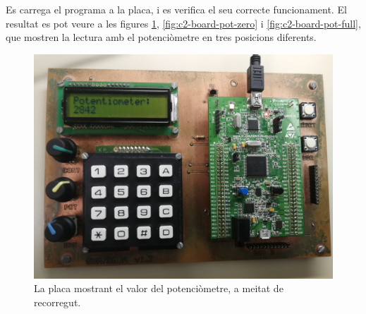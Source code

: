 Es carrega el programa a la placa, i es verifica el seu correcte funcionament.
El resultat es pot veure a les figures \ref{fig:c2-board-pot-mid}, \ref{fig:c2-board-pot-zero}
i \ref{fig:c2-board-pot-full}, que mostren la lectura amb el potenciòmetre en tres posicions diferents.

\begin{figure}
  \includegraphics[width=.99\columnwidth]{../photos/board/c2-pot-mid}
  \caption{ \label{fig:c2-board-pot-mid} La placa mostrant el valor del potenciòmetre, a meitat de recorregut. }
\end{figure}

